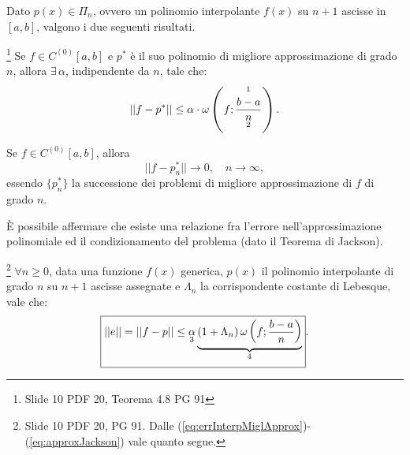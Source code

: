 Dato $p(x)\in\Pi_n$, ovvero un polinomio interpolante $f(x)$ su $n+1$ ascisse in $[a,b]$, valgono i due seguenti risultati.

\begin{theorem}[Jackson]\label{th:Jackson}\footnote{Slide 10 PDF 20, Teorema 4.8 PG 91}
    Se $f\in C^{(0)}[a,b]$ e $p^*$ è il suo polinomio di migliore approssimazione di grado $n$, allora $\exists\, \alpha$, indipendente da $n$, tale che:
    \begin{equation}\label{eq:approxJackson}
        ||f-p^*||\leq \alpha\cdot\omega\left(f;\frac{\overset{\footnotemark}{b-a}}{\underset{\footnotemark}{n}}\right).
    \end{equation}
\end{theorem}

\addtocounter{footnote}{-1}


\begin{corollary}
    Se $f\in C^{(0)}[a,b]$, allora
    \begin{equation*}
        ||f-p^*_n||\rightarrow 0,\quad n\rightarrow\infty,
    \end{equation*}
    essendo $\{p^*_n\}$ la successione dei problemi di migliore approssimazione di $f$ di grado $n$.
\end{corollary}


È possibile affermare che esiste una relazione fra l'errore nell'approssimazione polinomiale ed il condizionamento del problema (dato il Teorema di Jackson).

\begin{corollary}\footnote{Slide 10 PDF 20, PG 91. Dalle (\ref{eq:errInterpMiglApprox})-(\ref{eq:approxJackson}) vale quanto segue.}
    $\forall n\geq 0$, data una funzione $f(x)$ generica, $p(x)$ il polinomio interpolante di grado $n$ su $n+1$ ascisse assegnate e $\Lambda_n$ la corrispondente costante di Lebesque, vale che:
    \begin{equation}\label{eq:maggErrMiglAprrox}
        \boxed{||e||=||f-p||\leq\underset{\footnotemark}{\alpha}\underbrace{(1+\Lambda_n)\,\omega\left(f;\frac{b-a}{n}\right)}_{\footnotemark}}.
    \end{equation}
\end{corollary}

\addtocounter{footnote}{-1}

